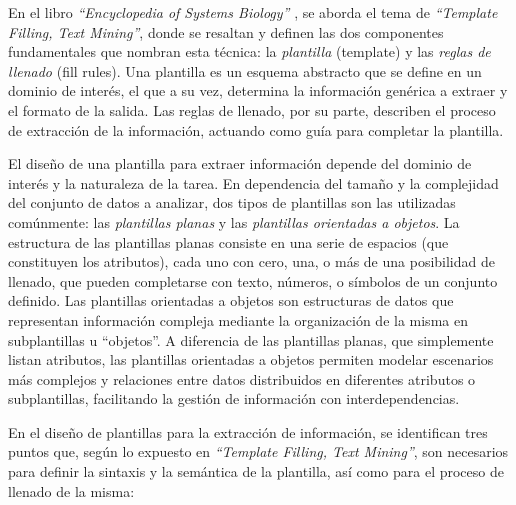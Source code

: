 En el libro \textit{``Encyclopedia of Systems Biology''} \cite{Raja2013}, se aborda el 
tema de \textit{``Template Filling, Text Mining''}, donde se resaltan y definen las 
dos componentes fundamentales que nombran esta técnica: la \textit{plantilla} (template) 
y las \textit{reglas de llenado} (fill rules). Una plantilla es un esquema abstracto 
que se define en un dominio de interés, el que a su vez, determina la información 
genérica a extraer y el formato de la salida. Las reglas de llenado, por su parte, 
describen el proceso de extracción de la información, actuando como guía para 
completar la plantilla.

El diseño de una plantilla para extraer información depende del dominio de interés 
y la naturaleza de la tarea. En dependencia del tamaño y la complejidad del 
conjunto de datos a analizar, dos tipos de plantillas son las utilizadas comúnmente: 
las \textit{plantillas planas} y las \textit{plantillas orientadas a objetos}. 
La estructura de las plantillas planas consiste en una serie de espacios 
(que constituyen los atributos), cada uno con cero, una, o más de una posibilidad 
de llenado, que pueden completarse con texto, números, o símbolos de un conjunto definido. 
Las plantillas orientadas a objetos son estructuras de datos que representan información 
compleja mediante la organización de la misma en subplantillas u ``objetos''. 
A diferencia de las plantillas planas, que simplemente listan atributos, las plantillas 
orientadas a objetos permiten modelar escenarios más complejos y relaciones entre 
datos distribuidos en diferentes atributos o subplantillas, facilitando la gestión 
de información con interdependencias.

En el diseño de plantillas para la extracción de información, se identifican tres 
puntos que, según lo expuesto en \textit{``Template Filling, Text Mining''}, son 
necesarios para definir la sintaxis y la semántica de la plantilla, así como para 
el proceso de llenado de la misma:


